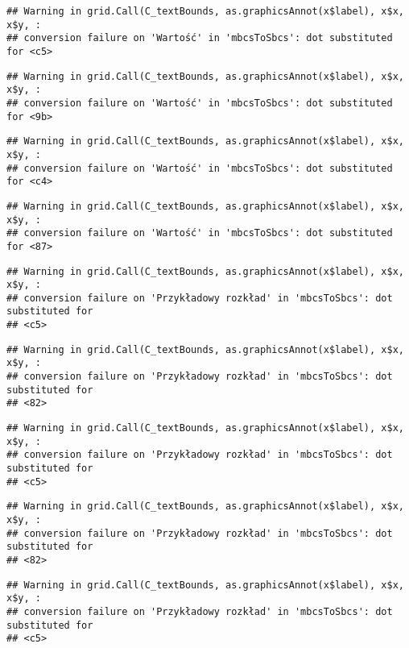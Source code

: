 \documentclass[
]{book}
\begin{document}
\begin{verbatim}
## Warning in grid.Call(C_textBounds, as.graphicsAnnot(x$label), x$x, x$y, :
## conversion failure on 'Wartość' in 'mbcsToSbcs': dot substituted for <c5>
\end{verbatim}

\begin{verbatim}
## Warning in grid.Call(C_textBounds, as.graphicsAnnot(x$label), x$x, x$y, :
## conversion failure on 'Wartość' in 'mbcsToSbcs': dot substituted for <9b>
\end{verbatim}

\begin{verbatim}
## Warning in grid.Call(C_textBounds, as.graphicsAnnot(x$label), x$x, x$y, :
## conversion failure on 'Wartość' in 'mbcsToSbcs': dot substituted for <c4>
\end{verbatim}

\begin{verbatim}
## Warning in grid.Call(C_textBounds, as.graphicsAnnot(x$label), x$x, x$y, :
## conversion failure on 'Wartość' in 'mbcsToSbcs': dot substituted for <87>
\end{verbatim}

\begin{verbatim}
## Warning in grid.Call(C_textBounds, as.graphicsAnnot(x$label), x$x, x$y, :
## conversion failure on 'Przykładowy rozkład' in 'mbcsToSbcs': dot substituted for
## <c5>
\end{verbatim}

\begin{verbatim}
## Warning in grid.Call(C_textBounds, as.graphicsAnnot(x$label), x$x, x$y, :
## conversion failure on 'Przykładowy rozkład' in 'mbcsToSbcs': dot substituted for
## <82>
\end{verbatim}

\begin{verbatim}
## Warning in grid.Call(C_textBounds, as.graphicsAnnot(x$label), x$x, x$y, :
## conversion failure on 'Przykładowy rozkład' in 'mbcsToSbcs': dot substituted for
## <c5>
\end{verbatim}

\begin{verbatim}
## Warning in grid.Call(C_textBounds, as.graphicsAnnot(x$label), x$x, x$y, :
## conversion failure on 'Przykładowy rozkład' in 'mbcsToSbcs': dot substituted for
## <82>
\end{verbatim}

\begin{verbatim}
## Warning in grid.Call(C_textBounds, as.graphicsAnnot(x$label), x$x, x$y, :
## conversion failure on 'Przykładowy rozkład' in 'mbcsToSbcs': dot substituted for
## <c5>
\end{verbatim}
\end{document}
